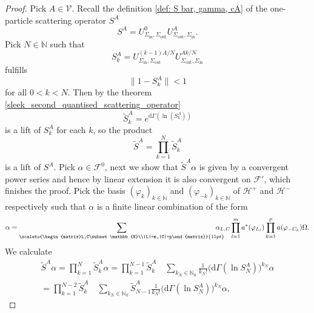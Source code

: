 \documentclass[b5paper,draft,openbib,12pt]{memoir}
\begin{document}
\begin{proof}
Pick \(A\in\mathcal{V}\). Recall the definition 
\ref{def: S bar, gamma, cA} of 
the one-particle scattering operator 
\(S^A\) 
\begin{equation}
  S^A= U^0_{\Sigma_{\text{in}},\Sigma_{\text{out}}}U^A_{\Sigma_{\text{out}},\Sigma_{\text{in}}}.
\end{equation}
Pick \(N\in\mathbb{N}\) such that 
\begin{equation}
  S^A_k=U^{(k-1)A/N}_{\Sigma_{\text{in}},\Sigma_{\text{out}}}U^{A k/N }_{\Sigma_{\text{out}},\Sigma_{\text{in}}}
\end{equation}
fulfills 
\begin{equation}
\|1-S^A_k\|<1
\end{equation}
for all \(0<k<N\). Then by the theorem \ref{sleek_second_quantised_scattering_operator}
\begin{equation}
  \tilde{S}^A_k=e^{\mathrm{d}\Gamma(\ln(S^A_k))}
\end{equation}
is a lift of \(S^A_k\) for each \(k\), so the product
\begin{equation}
  \tilde{S}^A = \prod_{k=1}^N \tilde{S}^A_k
\end{equation}
is a lift of \(S^A\). Pick \(\alpha \in \mathcal{F}^0\), 
next we show that \(\tilde{S}^A\alpha\) is given by 
a convergent power series and hence by linear 
extension it is also convergent on \(\mathcal{F}'\), 
which finishes the proof.
Pick the basis \((\varphi_{k})_{k\in\mathbb{N}}\) and 
\((\varphi_{-k})_{k\in\mathbb{N}}\) of 
\(\mathcal{H}^+\) and \(\mathcal{H}^-\) respectively 
such that \(\alpha\) is a finite linear combination of 
the form 
\begin{equation}
\alpha=\sum_{\scaleto{\begin{matrix}L,C\subset \mathbb{N}\\|L|=m,|C|=p\end{matrix}}{15pt}}  
  \hspace{-0.5cm}\alpha_{L,C} \prod_{l=1}^m a^*(\varphi_{L_l})\prod_{k=1}^p a(\varphi_{-C_k})\Omega.
\end{equation}
We calculate
\begin{align}
  \tilde{S}^A\alpha = \prod_{k=1}^N \tilde{S}^A_k\alpha 
  =  \prod_{k=1}^{N-1}\tilde{S}^A_k \quad  \sum_{k_N\in\mathbb{N}_0}\frac{1}{k_N!}\bigg(\mathrm{d}\Gamma(\ln S^A_N)\bigg)^{k_N}\alpha\\
  =  \prod_{k=1}^{N-2}\tilde{S}^A_k \quad  \sum_{k_N\in\mathbb{N}_0}\tilde{S}_{N-1}^A \frac{1}{k_N!}\bigg(\mathrm{d}\Gamma(\ln S^A_N)\bigg)^{k_N}\alpha,

\end{align}
\end{proof}
\end{document}

